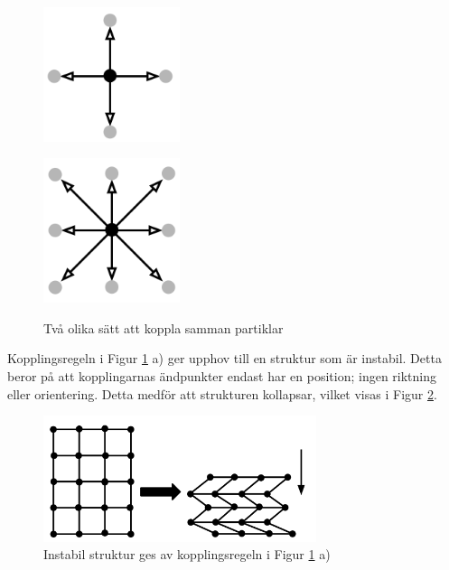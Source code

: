 \documentclass[a4paper,12pt,oneside,final,swedish]{extarticle}
\begin{document}
\begin{figure}
  \begin{minipage}[h!]{.5\linewidth}
    \centering
    \includegraphics[width=4cm]{Bilder/2D_4Neighbors.png} 
    \label{fig:1a}
  \end{minipage}
  \begin{minipage}[h!]{.5\linewidth}
    \centering
    \includegraphics[width=4cm]{Bilder/2D_8Neighbors.png} 
    \label{fig:1b}
  \end{minipage}
  \caption{Två olika sätt att koppla samman partiklar}\label{2D_Neighbors}
\end{figure}


Kopplingsregeln i Figur \ref{2D_Neighbors} a) ger upphov till en struktur som är instabil. Detta beror på att kopplingarnas ändpunkter endast har en position; ingen riktning eller orientering. Detta medför att strukturen kollapsar, vilket visas i Figur \ref{2D_Instabil}.


\begin{figure}[h!]
  \begin{center}
    \includegraphics[width=8cm]{Bilder/2D_Instabil.png} 
  \end{center}
  \caption{Instabil struktur ges av kopplingsregeln i Figur \ref{2D_Neighbors} a) }
  \label{2D_Instabil}
\end{figure}
\end{document}
